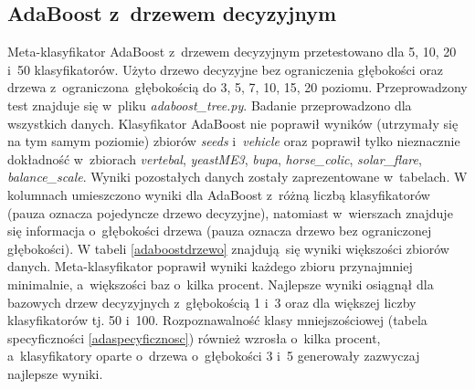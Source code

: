 \subsection{AdaBoost z~drzewem decyzyjnym}
Meta-klasyfikator AdaBoost z~drzewem decyzyjnym przetestowano dla 5, 10, 20 i~50 klasyfikatorów. Użyto drzewo decyzyjne bez ograniczenia głębokości oraz drzewa z~ograniczona głębokością do 3, 5, 7, 10, 15, 20 poziomu. Przeprowadzony test znajduje się w~pliku \textit{adaboost\_tree.py}. Badanie przeprowadzono dla wszystkich danych. Klasyfikator AdaBoost nie poprawił wyników (utrzymały się na tym samym poziomie) zbiorów \textit{seeds} i~\textit{vehicle} oraz poprawił tylko nieznacznie dokładność w~zbiorach \textit{vertebal}, \textit{yeastME3}, \textit{bupa}, \textit{horse\_colic}, \textit{solar\_flare}, \textit{balance\_scale}. Wyniki pozostałych danych zostały zaprezentowane w~tabelach. W kolumnach umieszczono wyniki dla AdaBoost z~różną liczbą klasyfikatorów (pauza oznacza pojedyncze drzewo decyzyjne), natomiast w~wierszach znajduje się informacja o~głębokości drzewa (pauza oznacza drzewo bez ograniczonej głębokości). W tabeli \ref{adaboostdrzewo} znajdują się wyniki większości zbiorów danych. Meta-klasyfikator poprawił wyniki każdego zbioru przynajmniej minimalnie, a~większości baz o~kilka procent. Najlepsze wyniki osiągnął dla bazowych drzew decyzyjnych z~głębokością 1 i~3 oraz dla większej liczby klasyfikatorów tj. 50 i~100. Rozpoznawalność klasy mniejszościowej (tabela specyficzności \ref{adaspecyficznosc}) również wzrosła o~kilka procent, a~klasyfikatory oparte o~drzewa o~głębokości 3 i~5 generowały zazwyczaj najlepsze wyniki.
